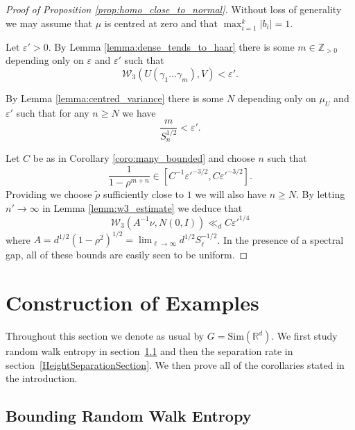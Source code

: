 \documentclass[10pt, english,oneside,reqno]{amsart}
\theoremstyle{plain}
\theoremstyle{remark}
\numberwithin{equation}{section}
\numberwithin{figure}{section}
\newcommand{\Z}{\mathbb{Z}}
\newcommand{\R}{\mathbb{R}}
\begin{document}
\begin{proof}[Proof of Proposition \ref{prop:homo_close_to_normal}]
	Without loss of generality we may assume that $\mu$ is centred at zero and that $\max_{i=1}^k |b_i| = 1$.
 
    Let $\varepsilon' > 0$. By Lemma \ref{lemma:dense_tends_to_haar} there is some $m \in \Z_{>0}$ depending only on $\varepsilon$ and $\varepsilon'$ such that
	\begin{equation*}
		\mathcal{W}_3(U(\gamma_1 \dots \gamma_m), V) < \varepsilon'.
	\end{equation*}
	
	By Lemma \ref{lemma:centred_variance} there is some $N$ depending only on $\mu_U$ and $\varepsilon'$ such that for any $n \geq N$ we have
	\begin{equation*}
		\frac{m}{S_{n}^{1/2}} < \varepsilon'.
	\end{equation*}

    Let $C$ be as in Corollary \ref{coro:many_bounded} and choose $n$ such that 
    \begin{equation*}
        \frac{1}{1 - \rho^{m+n}} \in [C^{-1} \varepsilon'^{-3/2}, C \varepsilon'^{-3/2}].
    \end{equation*}
    Providing we choose $\tilde{\rho}$ sufficiently close to $1$ we will also have $n \geq N$. By letting $n' \to \infty$ in Lemma \ref{lemm:w3_estimate} we deduce that
    \begin{equation*}
		\mathcal{W}_3(A^{-1}\nu, N(0, I)) \ll_d C \varepsilon'^{1/4}
	\end{equation*}
    where $A = d^{1/2}(1 - \rho^2)^{1/2} = \lim_{\ell \to \infty} d^{1/2}S_{\ell}^{-1/2} $. In the presence of a spectral gap, all of these bounds are easily seen to be uniform.
\end{proof}

    \section{Construction of Examples}

    \label{section:examples}

Throughout this section we denote as usual by $G = \mathrm{Sim}(\R^d)$. We first study random walk entropy in section~\ref{subsection:Entropy} and then the separation rate in section~\ref{HeightSeparationSection}.  We then prove all of the corollaries stated in the introduction.

\subsection{Bounding Random Walk Entropy}\label{subsection:Entropy}
\end{document}
